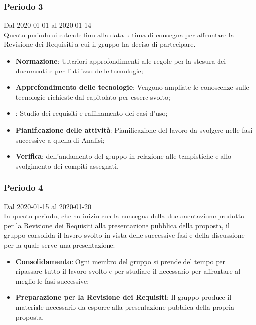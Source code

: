 \subsubsection{Periodo 3}
Dal 2020-01-01 al 2020-01-14\\
Questo periodo si estende fino alla data ultima di consegna per affrontare la Revisione dei Requisiti a cui il gruppo ha deciso di partecipare.
\begin{itemize}
	\item \textbf{Normazione}: Ulteriori approfondimenti alle regole per la stesura dei documenti e per l'utilizzo delle tecnologie;
	\item \textbf{Approfondimento delle tecnologie}: Vengono ampliate le conoscenze sulle tecnologie richieste dal capitolato per essere svolto;
	\item \textbf{\AdR{}}: Studio dei requisiti e raffinamento dei casi d'uso;
	\item \textbf{Pianificazione delle attività}: Pianificazione del lavoro da svolgere nelle fasi successive a quella di Analisi;
	\item \textbf{Verifica}:  dell'andamento del gruppo in relazione alle tempistiche e allo svolgimento dei compiti assegnati.
\end{itemize}

\subsubsection{Periodo 4} 
Dal 2020-01-15 al 2020-01-20\\
In questo periodo, che ha inizio con la consegna della documentazione prodotta per la Revisione dei Requisiti alla presentazione pubblica della proposta, il gruppo consolida il lavoro svolto in vista delle successive fasi e della discussione per la quale serve una presentazione:
\begin{itemize}
	\item \textbf{Consolidamento}: Ogni membro del gruppo si prende del tempo per ripassare tutto il lavoro svolto e per studiare il necessario per affrontare al meglio le fasi successive;
	\item \textbf{Preparazione per la Revisione dei Requisiti}: Il gruppo produce il materiale necessario da esporre alla presentazione pubblica della propria proposta.
\end{itemize}


